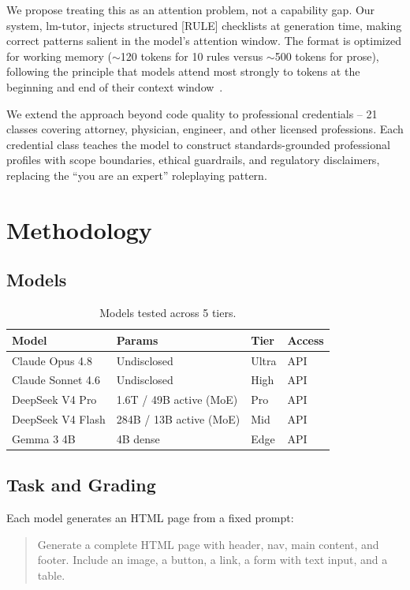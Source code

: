 \documentclass{article}
\begin{document}
We propose treating this as an attention problem, not a capability gap. Our
system, lm-tutor, injects structured [RULE] checklists at generation time,
making correct patterns salient in the model's attention window. The format is
optimized for working memory ($\sim$120 tokens for 10 rules versus $\sim$500
tokens for prose), following the principle that models attend most strongly to
tokens at the beginning and end of their context window~\cite{liu2023}.

We extend the approach beyond code quality to professional credentials -- 21
classes covering attorney, physician, engineer, and other licensed professions.
Each credential class teaches the model to construct standards-grounded
professional profiles with scope boundaries, ethical guardrails, and regulatory
disclaimers, replacing the ``you are an expert'' roleplaying pattern.

\section{Methodology}

\subsection{Models}

\begin{table}[h]
\centering
\begin{tabular}{llll}
\toprule
Model & Params & Tier & Access \\
\midrule
Claude Opus 4.8 & Undisclosed & Ultra & API \\
Claude Sonnet 4.6 & Undisclosed & High & API \\
DeepSeek V4 Pro & 1.6T / 49B active (MoE) & Pro & API \\
DeepSeek V4 Flash & 284B / 13B active (MoE) & Mid & API \\
Gemma 3 4B & 4B dense & Edge & API \\
\bottomrule
\end{tabular}
\caption{Models tested across 5 tiers.}\label{tab:models}
\end{table}

\subsection{Task and Grading}

Each model generates an HTML page from a fixed prompt:

\begin{quote}
Generate a complete HTML page with header, nav, main content, and footer.
Include an image, a button, a link, a form with text input, and a table.
\end{quote}
\end{document}
